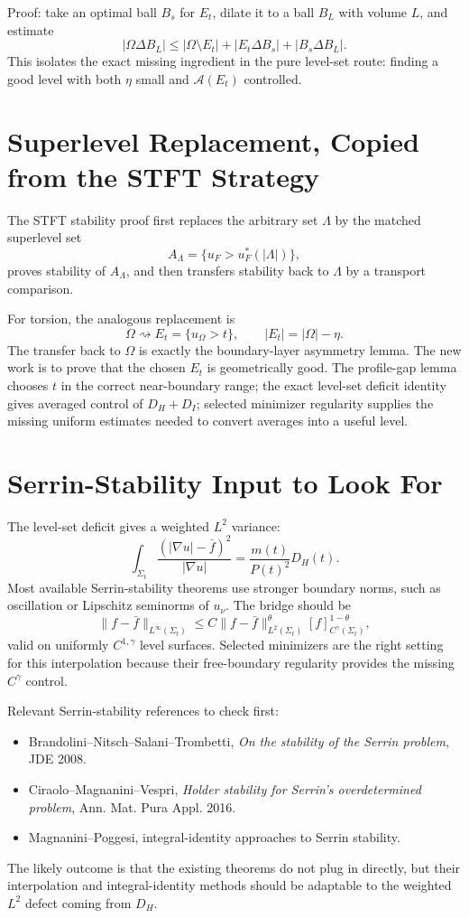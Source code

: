 \documentclass[11pt]{article}
\begin{document}
Proof: take an optimal ball \(B_s\) for \(E_t\), dilate it to a ball \(B_L\)
with volume \(L\), and estimate
\[
|\Omega\Delta B_L|
\le
|\Omega\setminus E_t|
+|E_t\Delta B_s|
+|B_s\Delta B_L|.
\]
This isolates the exact missing ingredient in the pure level-set route:
finding a good level with both \(\eta\) small and \(\mathcal A(E_t)\) controlled.

\section{Superlevel Replacement, Copied from the STFT Strategy}

The STFT stability proof first replaces the arbitrary set \(\Lambda\) by the
matched superlevel set
\[
A_\Lambda=\{u_F>u_F^*(|\Lambda|)\},
\]
proves stability of \(A_\Lambda\), and then transfers stability back to
\(\Lambda\) by a transport comparison.

For torsion, the analogous replacement is
\[
\Omega\rightsquigarrow E_t=\{u_\Omega>t\},
\qquad |E_t|=|\Omega|-\eta.
\]
The transfer back to \(\Omega\) is exactly the boundary-layer asymmetry lemma.
The new work is to prove that the chosen \(E_t\) is geometrically good. The
profile-gap lemma chooses \(t\) in the correct near-boundary range; the exact
level-set deficit identity gives averaged control of \(D_H+D_I\); selected
minimizer regularity supplies the missing uniform estimates needed to convert
averages into a useful level.

\section{Serrin-Stability Input to Look For}

The level-set deficit gives a weighted \(L^2\) variance:
\[
\int_{\Sigma_t}\frac{(|\nabla u|-\bar f)^2}{|\nabla u|}
=
\frac{m(t)}{P(t)^2}D_H(t).
\]
Most available Serrin-stability theorems use stronger boundary norms, such as
oscillation or Lipschitz seminorms of \(u_\nu\). The bridge should be
\[
\|f-\bar f\|_{L^\infty(\Sigma_t)}
\le
C
\|f-\bar f\|_{L^2(\Sigma_t)}^\theta
[f]_{C^\gamma(\Sigma_t)}^{1-\theta},
\]
valid on uniformly \(C^{1,\gamma}\) level surfaces. Selected minimizers are the
right setting for this interpolation because their free-boundary regularity
provides the missing \(C^\gamma\) control.

Relevant Serrin-stability references to check first:
\begin{itemize}
\item Brandolini--Nitsch--Salani--Trombetti, \emph{On the stability of the
Serrin problem}, JDE 2008.
\item Ciraolo--Magnanini--Vespri, \emph{Holder stability for Serrin's
overdetermined problem}, Ann. Mat. Pura Appl. 2016.
\item Magnanini--Poggesi, integral-identity approaches to Serrin stability.
\end{itemize}
The likely outcome is that the existing theorems do not plug in directly, but
their interpolation and integral-identity methods should be adaptable to the
weighted \(L^2\) defect coming from \(D_H\).
\end{document}
